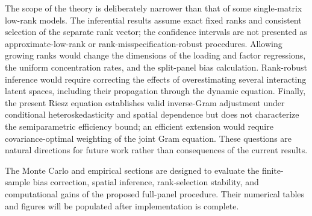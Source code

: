 \documentclass[11pt]{article}
\numberwithin{equation}{section}
\theoremstyle{remark}
\begin{document}
The scope of the theory is deliberately narrower than that of some single-matrix low-rank models. The inferential results assume exact fixed ranks and consistent selection of the separate rank vector; the confidence intervals are not presented as approximate-low-rank or rank-misspecification-robust procedures. Allowing growing ranks would change the dimensions of the loading and factor regressions, the uniform concentration rates, and the split-panel bias calculation. Rank-robust inference would require correcting the effects of overestimating several interacting latent spaces, including their propagation through the dynamic equation. Finally, the present Riesz equation establishes valid inverse-Gram adjustment under conditional heteroskedasticity and spatial dependence but does not characterize the semiparametric efficiency bound; an efficient extension would require covariance-optimal weighting of the joint Gram equation. These questions are natural directions for future work rather than consequences of the current results.

The Monte Carlo and empirical sections are designed to evaluate the finite-sample bias correction, spatial inference, rank-selection stability, and computational gains of the proposed full-panel procedure. Their numerical tables and figures will be populated after implementation is complete.
\end{document}
